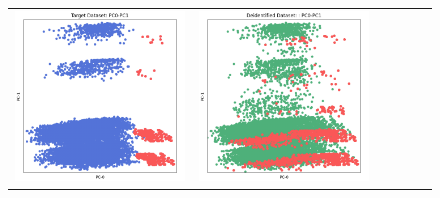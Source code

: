 \begin{figure}[p!]
\begin{tabular}{@{} M{0.166\textwidth} M{0.166\textwidth} | M{0.166\textwidth} M{0.166\textwidth} | M{0.166\textwidth} M{0.166\textwidth} @{}}
       \includegraphics[width=\linewidth]{z_PRAM.orig.png} &
       \includegraphics[width=\linewidth]{z_PRAM.syn.png} &

\end{tabular}
\end{figure}
